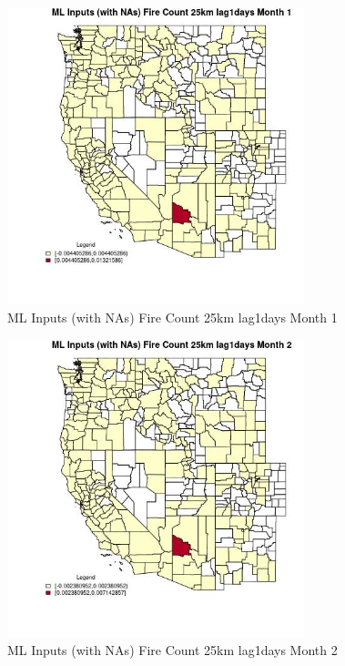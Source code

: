 \begin{figure} 
\centering  
\includegraphics[width=0.77\textwidth]{Code_Outputs/Report_ML_input_PM25_Step4_part_e_de_duplicated_aves_compiled_2019-05-21wNAs_CountyFire_Count_25km_lag1daysmedianMonth1.jpg} 
\caption{\label{fig:Report_ML_input_PM25_Step4_part_e_de_duplicated_aves_compiled_2019-05-21wNAsCountyFire_Count_25km_lag1daysmedianMonth1}ML Inputs (with NAs) Fire Count 25km lag1days Month 1} 
\end{figure} 
 

\begin{figure} 
\centering  
\includegraphics[width=0.77\textwidth]{Code_Outputs/Report_ML_input_PM25_Step4_part_e_de_duplicated_aves_compiled_2019-05-21wNAs_CountyFire_Count_25km_lag1daysmedianMonth2.jpg} 
\caption{\label{fig:Report_ML_input_PM25_Step4_part_e_de_duplicated_aves_compiled_2019-05-21wNAsCountyFire_Count_25km_lag1daysmedianMonth2}ML Inputs (with NAs) Fire Count 25km lag1days Month 2} 
\end{figure} 
 

